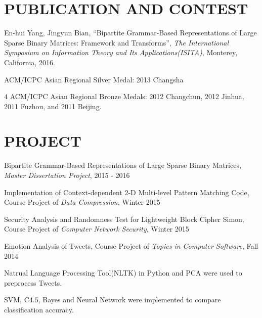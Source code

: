 \documentclass{res}
\newcommand{\parsp}{\vspace{-0.5\baselineskip}}
\newcommand{\additemindent}{\addtolength{\itemindent}{1em}}
\begin{document}
\begin{resume}
\parsp
\section{PUBLICATION AND CONTEST}
	\begin{asparaitem}
		\item En-hui Yang, Jingyun Bian, 
		``Bipartite Grammar-Based Representations of Large Sparse Binary Matrices: Framework and Transforms'', 
		\emph{The International Symposium on Information Theory and Its Applications(ISITA)}, 
		Monterey, California, 
		2016.

		\vspace{0.3em}
		\item ACM/ICPC Asian Regional Silver Medal: 2013 Changsha
		\item $4$ ACM/ICPC Asian Regional Bronze Medals: 2012 Changchun, 2012 Jinhua, 2011 Fuzhou, and 2011 Beijing.
	\end{asparaitem}


\parsp
\section{PROJECT}
\begin{asparaenum}
	\item Bipartite Grammar-Based Representations of Large Sparse Binary Matrices, \emph{Master Dissertation Project}, 2015 - 2016

	\item Implementation of Context-dependent $2$-D Multi-level Pattern Matching Code, Course Project of \emph{Data Compression}, Winter 2015

	\item Security Analysis and Randomness Test for Lightweight Block Cipher Simon, Course Project of \emph{Computer Network Security}, Winter 2015

	\item Emotion Analysis of Tweets, Course Project of \emph{Topics in Computer Software}, Fall 2014
		\begin{asparaitem}
			\additemindent
			\item Natrual Language Processing Tool(NLTK) in Python and PCA were used to preprocess Tweets.
			\item SVM, C$4.5$, Bayes and Neural Network were implemented to compare classification accuracy.
		\end{asparaitem}


\end{asparaenum}
\end{resume}
\end{document}
